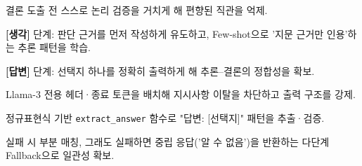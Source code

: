 \begin{substeps}
  \item 결론 도출 전 스스로 논리 검증을 거치게 해 편향된 직관을 억제.
  \item \textbf{[생각]} 단계: 판단 근거를 먼저 작성하게 유도하고, Few-shot으로 '지문 근거만 인용'하는 추론 패턴을 학습.
  \item \textbf{[답변]} 단계: 선택지 하나를 정확히 출력하게 해 추론--결론의 정합성을 확보.
\end{substeps}

\begin{substeps}
  \item Llama-3 전용 헤더·종료 토큰을 배치해 지시사항 이탈을 차단하고 출력 구조를 강제.
  \item 정규표현식 기반 \texttt{extract\_answer} 함수로 "답변: [선택지]" 패턴을 추출·검증.
  \item 실패 시 부분 매칭, 그래도 실패하면 중립 응답('알 수 없음')을 반환하는 다단계 Fallback으로 일관성 확보.
\end{substeps}


